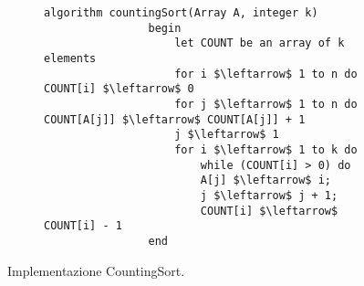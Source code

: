 \documentclass{subfiles}
\begin{document}
\begin{figure}[!h]
    \centering
    \begin{subfigure}[b]{0.75\textwidth}
        \begin{lstlisting}[language = algol]
            algorithm countingSort(Array A, integer k)
                begin
                    let COUNT be an array of k elements
                    for i $\leftarrow$ 1 to n do COUNT[i] $\leftarrow$ 0
                    for j $\leftarrow$ 1 to n do COUNT[A[j]] $\leftarrow$ COUNT[A[j]] + 1
                    j $\leftarrow$ 1
                    for i $\leftarrow$ 1 to k do
                        while (COUNT[i] > 0) do
                        A[j] $\leftarrow$ i;
                        j $\leftarrow$ j + 1;
                        COUNT[i] $\leftarrow$ COUNT[i] - 1
                end
        \end{lstlisting}
    \end{subfigure}
    \caption{Implementazione CountingSort.}
    \label{Fig:4.8}
\end{figure}
\end{document}
